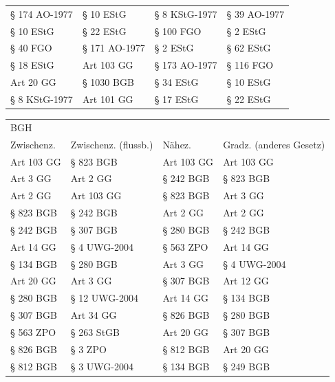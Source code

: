 \begin{tabular}{llll}
  § 174 AO-1977 &            § 10 EStG & § 8 KStG-1977 &            § 39 AO-1977 \\
      § 10 EStG &            § 22 EStG &     § 100 FGO &                § 2 EStG \\
       § 40 FGO &        § 171 AO-1977 &      § 2 EStG &               § 62 EStG \\
      § 18 EStG &           Art 103 GG & § 173 AO-1977 &               § 116 FGO \\
      Art 20 GG &           § 1030 BGB &     § 34 EStG &               § 10 EStG \\
  § 8 KStG-1977 &           Art 101 GG &     § 17 EStG &               § 22 EStG \\
\bottomrule
\end{tabular}

\begin{tabular}{llll}
\toprule
\multicolumn{4}{l}{BGH} \\
Zwischenz. & Zwischenz. (flussb.) &     Nähez. & Gradz. (anderes Gesetz) \\
\midrule
Art 103 GG &            § 823 BGB & Art 103 GG &              Art 103 GG \\
  Art 3 GG &             Art 2 GG &  § 242 BGB &               § 823 BGB \\
  Art 2 GG &           Art 103 GG &  § 823 BGB &                Art 3 GG \\
 § 823 BGB &            § 242 BGB &   Art 2 GG &                Art 2 GG \\
 § 242 BGB &            § 307 BGB &  § 280 BGB &               § 242 BGB \\
 Art 14 GG &         § 4 UWG-2004 &  § 563 ZPO &               Art 14 GG \\
 § 134 BGB &            § 280 BGB &   Art 3 GG &            § 4 UWG-2004 \\
 Art 20 GG &             Art 3 GG &  § 307 BGB &               Art 12 GG \\
 § 280 BGB &        § 12 UWG-2004 &  Art 14 GG &               § 134 BGB \\
 § 307 BGB &            Art 34 GG &  § 826 BGB &               § 280 BGB \\
 § 563 ZPO &           § 263 StGB &  Art 20 GG &               § 307 BGB \\
 § 826 BGB &              § 3 ZPO &  § 812 BGB &               Art 20 GG \\
 § 812 BGB &         § 3 UWG-2004 &  § 134 BGB &               § 249 BGB \\

\end{tabular}
